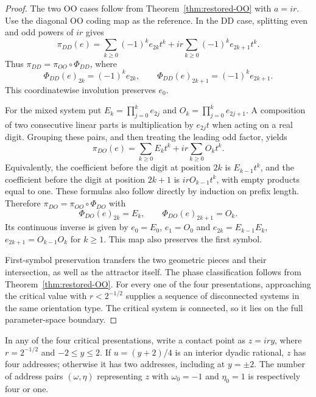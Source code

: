\begin{proof}
The two OO cases follow from Theorem~\ref{thm:restored-OO} with $a=ir$.
Use the diagonal OO coding map as the reference. In the DD case,
splitting even and odd powers of $ir$ gives
\[
 \pi_{DD}(e)=\sum_{k\ge0}(-1)^ke_{2k}t^k
              +ir\sum_{k\ge0}(-1)^ke_{2k+1}t^k.
\]
Thus $\pi_{DD}=\pi_{OO}\circ\Phi_{DD}$, where
\[
 \Phi_{DD}(e)_{2k}=(-1)^ke_{2k},\qquad
 \Phi_{DD}(e)_{2k+1}=(-1)^ke_{2k+1}.
\]
This coordinatewise involution preserves $e_0$.

For the mixed system put
$E_k=\prod_{j=0}^ke_{2j}$ and
$O_k=\prod_{j=0}^ke_{2j+1}$. A composition of two consecutive
linear parts is multiplication by $e_{2j}t$ when acting on a real
digit. Grouping these pairs, and then treating the leading odd
factor, yields
\[
 \pi_{DO}(e)=\sum_{k\ge0}E_kt^k+ir\sum_{k\ge0}O_kt^k.
\]
Equivalently, the coefficient before the digit at position $2k$ is
$E_{k-1}t^k$, and the coefficient before the digit at position
$2k+1$ is $irO_{k-1}t^k$, with empty products equal to one.
These formulas also follow directly by induction on prefix length.
Therefore $\pi_{DO}=\pi_{OO}\circ\Phi_{DO}$ with
\[
 \Phi_{DO}(e)_{2k}=E_k,\qquad
 \Phi_{DO}(e)_{2k+1}=O_k.
\]
Its continuous inverse is given by
$e_0=E_0$, $e_1=O_0$ and
$e_{2k}=E_{k-1}E_k$, $e_{2k+1}=O_{k-1}O_k$ for $k\ge1$.
This map also preserves the first symbol.

First-symbol preservation transfers the two geometric pieces and
their intersection, as well as the attractor itself. The phase
classification follows from Theorem~\ref{thm:restored-OO}.
For every one of the four presentations, approaching the critical
value with $r<2^{-1/2}$ supplies a sequence of disconnected systems in
the same orientation type. The critical system is connected, so
it lies on the full parameter-space boundary.
\end{proof}

\begin{proposition}
\label{prop:restored-interface-addresses}
In any of the four critical presentations, write a contact point
as $z=iry$, where $r=2^{-1/2}$ and $-2\le y\le2$. If
$u=(y+2)/4$ is an interior dyadic rational, $z$ has four addresses;
otherwise it has two addresses, including at $y=\pm2$.
The number of address pairs $(\omega,\eta)$ representing $z$ with
$\omega_0=-1$ and $\eta_0=1$ is respectively four or one.
\end{proposition}

